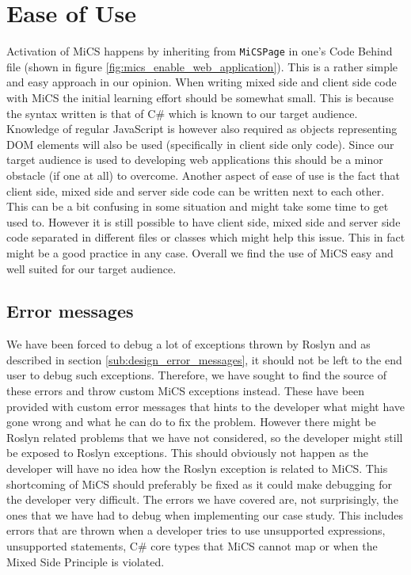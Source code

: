 \section{Ease of Use} %
\label{sec:ease_of_use}
	Activation of MiCS happens by inheriting from \texttt{MiCSPage} in one's Code Behind file (shown in figure \ref{fig:mics_enable_web_application}). This is a rather simple and easy approach in our opinion. When writing mixed side and client side code with MiCS the initial learning effort should be somewhat small. This is because the syntax written is that of C\# which is known to our target audience. Knowledge of regular JavaScript is however also required as objects representing DOM elements will also be used (specifically in client side only code). Since our target audience is used to developing web applications this should be a minor obstacle (if one at all) to overcome. Another aspect of ease of use is the fact that client side, mixed side and server side code can be written next to each other. This can be a bit confusing in some situation and might take some time to get used to. However it is still possible to have client side, mixed side and server side code separated in different files or classes which might help this issue. This in fact might be a good practice in any case. Overall we find the use of MiCS easy and well suited for our target audience.

	\subsection{Error messages} %
	\label{sub:evaluation_of_error_messages}
		We have been forced to debug a lot of exceptions thrown by Roslyn and as described in section \ref{sub:design_error_messages}, it should not be left to the end user to debug such exceptions. Therefore, we have sought to find the source of these errors and throw custom MiCS exceptions instead. These have been provided with custom error messages that hints to the developer what might have gone wrong and what he can do to fix the problem. However there might be Roslyn related problems that we have not considered, so the developer might still be exposed to Roslyn exceptions. This should obviously not happen as the developer will have no idea how the Roslyn exception is related to MiCS. This shortcoming of MiCS should preferably be fixed as it could make debugging for the developer very difficult. The errors we have covered are, not surprisingly, the ones that we have had to debug when implementing our case study. This includes errors that are thrown when a developer tries to use unsupported expressions, unsupported statements, C\# core types that MiCS cannot map or when the Mixed Side Principle is violated.

	

